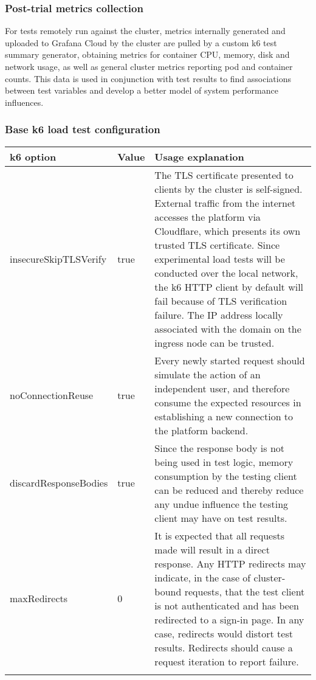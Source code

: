 \subsubsection{Post-trial metrics collection}

For tests remotely run against the cluster, metrics internally generated and uploaded to Grafana Cloud by the cluster are pulled by a custom k6 test summary generator, obtaining metrics for container CPU, memory, disk and network usage, as well as general cluster metrics reporting pod and container counts. This data is used in conjunction with test results to find associations between test variables and develop a better model of system performance influences.

\subsubsection{Base k6 load test configuration}

\begin{tabularx}{\textwidth}{|p{}|p{}|X|}
    \hline
    \textbf{k6 option} & \textbf{Value} & \textbf{Usage explanation}  \\ \hline
    insecureSkipTLSVerify & true & The TLS certificate presented to clients by the cluster is self-signed. External traffic from the internet accesses the platform via Cloudflare, which presents its own trusted TLS certificate. Since experimental load tests will be conducted over the local network, the k6 HTTP client by default will fail because of TLS verification failure. The IP address locally associated with the domain on the ingress node can be trusted. \\ \hline
    noConnectionReuse & true & Every newly started request should simulate the action of an independent user, and therefore consume the expected resources in establishing a new connection to the platform backend.  \\ \hline
    discardResponseBodies & true & Since the response body is not being used in test logic, memory consumption by the testing client can be reduced and thereby reduce any undue influence the testing client may have on test results. \\ \hline
    maxRedirects & 0 & It is expected that all requests made will result in a direct response. Any HTTP redirects may indicate, in the case of cluster-bound requests, that the test client is not authenticated and has been redirected to a sign-in page. In any case, redirects would distort test results. Redirects should cause a request iteration to report failure. \\ \hline

    \caption{Base options set for k6 load tests}
    \label{table:k6-load-test-options}
\end{tabularx}
    

